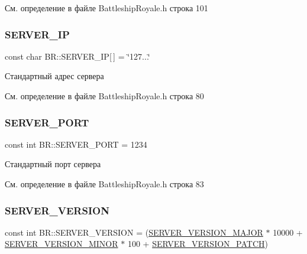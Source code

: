 \begin{DoxyCode}{0}
\end{DoxyCode}
 

См. определение в файле Battleship\+Royale.\+h строка 101

\mbox{\label{namespace_b_r_ae2055a331ff0a0d44ecdf49d643c143b}} 
\subsubsection{\texorpdfstring{SERVER\_IP}{SERVER\_IP}}
{\footnotesize\ttfamily const char B\+R\+::\+S\+E\+R\+V\+E\+R\+\_\+\+IP\mbox{[}$\,$\mbox{]} = \char`\"{}127...\char`\"{}}



Стандартный адрес сервера 



См. определение в файле Battleship\+Royale.\+h строка 80

\mbox{\label{namespace_b_r_a93dcd985876e063e59cb37eeb4f49bc8}} 
\subsubsection{\texorpdfstring{SERVER\_PORT}{SERVER\_PORT}}
{\footnotesize\ttfamily const int B\+R\+::\+S\+E\+R\+V\+E\+R\+\_\+\+P\+O\+RT = 1234}



Стандартный порт сервера 



См. определение в файле Battleship\+Royale.\+h строка 83

\mbox{\label{namespace_b_r_adfde74493201d02cbbe52fc1d83bf1ec}} 
\subsubsection{\texorpdfstring{SERVER\_VERSION}{SERVER\_VERSION}}
{\footnotesize\ttfamily const int B\+R\+::\+S\+E\+R\+V\+E\+R\+\_\+\+V\+E\+R\+S\+I\+ON = (\mbox{\hyperlink{namespace_b_r_a767d5d7fec5adfa1bf5a7c03f98beaaf}{S\+E\+R\+V\+E\+R\+\_\+\+V\+E\+R\+S\+I\+O\+N\+\_\+\+M\+A\+J\+OR}} $\ast$ 10000 + \mbox{\hyperlink{namespace_b_r_afb69faba1bc3b5d31b8514c0103b72a0}{S\+E\+R\+V\+E\+R\+\_\+\+V\+E\+R\+S\+I\+O\+N\+\_\+\+M\+I\+N\+OR}} $\ast$ 100 + \mbox{\hyperlink{namespace_b_r_ad496b6d1eb6371bb740df7c7fac12aba}{S\+E\+R\+V\+E\+R\+\_\+\+V\+E\+R\+S\+I\+O\+N\+\_\+\+P\+A\+T\+CH}})}



